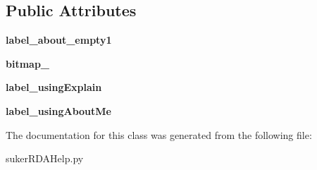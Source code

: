 \subsection*{Public Attributes}
\begin{DoxyCompactItemize}
\item 
\hypertarget{classsuker_r_d_a_1_1rda_pkg_1_1suker_r_d_a_help_1_1_help_about_dialog_a17150991e836c30e2708d014bdf86689}{{\bfseries label\+\_\+about\+\_\+empty1}}\label{classsuker_r_d_a_1_1rda_pkg_1_1suker_r_d_a_help_1_1_help_about_dialog_a17150991e836c30e2708d014bdf86689}

\item 
\hypertarget{classsuker_r_d_a_1_1rda_pkg_1_1suker_r_d_a_help_1_1_help_about_dialog_aa83891e2d04184db0aa734f2a88c733c}{{\bfseries bitmap\+\_}}\label{classsuker_r_d_a_1_1rda_pkg_1_1suker_r_d_a_help_1_1_help_about_dialog_aa83891e2d04184db0aa734f2a88c733c}

\item 
\hypertarget{classsuker_r_d_a_1_1rda_pkg_1_1suker_r_d_a_help_1_1_help_about_dialog_a585acecefe8e3705ce89e788faf3d4b1}{{\bfseries label\+\_\+using\+Explain}}\label{classsuker_r_d_a_1_1rda_pkg_1_1suker_r_d_a_help_1_1_help_about_dialog_a585acecefe8e3705ce89e788faf3d4b1}

\item 
\hypertarget{classsuker_r_d_a_1_1rda_pkg_1_1suker_r_d_a_help_1_1_help_about_dialog_aeedc31b05cdbf3788d3452d4b55d5e69}{{\bfseries label\+\_\+using\+About\+Me}}\label{classsuker_r_d_a_1_1rda_pkg_1_1suker_r_d_a_help_1_1_help_about_dialog_aeedc31b05cdbf3788d3452d4b55d5e69}

\end{DoxyCompactItemize}


The documentation for this class was generated from the following file\+:\begin{DoxyCompactItemize}
\item 
suker\+R\+D\+A\+Help.\+py\end{DoxyCompactItemize}
